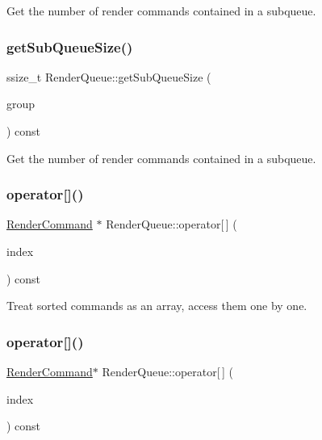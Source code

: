Get the number of render commands contained in a subqueue. \mbox{\label{classRenderQueue_a0e2d32f2bb26fac3c08b6a7e8d827b04}} 
\subsubsection{\texorpdfstring{get\+Sub\+Queue\+Size()}{getSubQueueSize()}\hspace{0.1cm}{\footnotesize\ttfamily [2/2]}}
{\footnotesize\ttfamily ssize\+\_\+t Render\+Queue\+::get\+Sub\+Queue\+Size (\begin{DoxyParamCaption}\item[{\hyperlink{classRenderQueue_a546a6ca0aa906f2fd8f86c698c76854e}{Q\+U\+E\+U\+E\+\_\+\+G\+R\+O\+UP}}]{group }\end{DoxyParamCaption}) const\hspace{0.3cm}{\ttfamily [inline]}}

Get the number of render commands contained in a subqueue. \mbox{\label{classRenderQueue_ac5131e58ffb15d488fb752fb4a6fa791}} 
\subsubsection{\texorpdfstring{operator[]()}{operator[]()}\hspace{0.1cm}{\footnotesize\ttfamily [1/2]}}
{\footnotesize\ttfamily \hyperlink{classRenderCommand}{Render\+Command} $\ast$ Render\+Queue\+::operator\mbox{[}$\,$\mbox{]} (\begin{DoxyParamCaption}\item[{ssize\+\_\+t}]{index }\end{DoxyParamCaption}) const}

Treat sorted commands as an array, access them one by one. \mbox{\label{classRenderQueue_adf360589819adb5ec72a950d20d2ae22}} 
\subsubsection{\texorpdfstring{operator[]()}{operator[]()}\hspace{0.1cm}{\footnotesize\ttfamily [2/2]}}
{\footnotesize\ttfamily \hyperlink{classRenderCommand}{Render\+Command}$\ast$ Render\+Queue\+::operator\mbox{[}$\,$\mbox{]} (\begin{DoxyParamCaption}\item[{ssize\+\_\+t}]{index }\end{DoxyParamCaption}) const}

